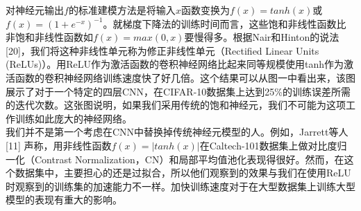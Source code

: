 对神经元输出$f$的标准建模方法是将输入$x$函数变换为$f(x) = tanh(x)$或$f(x) = (1+e^{-x})^{-1}$。就梯度下降法的训练时间而言，这些饱和非线性函数比非饱和非线性函数如$f(x)=max(0,x)$要慢得多。根据Nair和Hinton的说法[20]，我们将这种非线性单元称为修正非线性单元（Rectified Linear Units (ReLUs)）。用ReLU作为激活函数的卷积神经网络比起来同等规模使用tanh作为激活函数的卷积神经网络训练速度快了好几倍。这个结果可以从图一中看出来，该图展示了对于一个特定的四层CNN，在CIFAR-10数据集上达到25\%的训练误差所需的迭代次数。这张图说明，如果我们采用传统的饱和神经元，我们不可能为这项工作训练如此庞大的神经网络。\\

我们并不是第一个考虑在CNN中替换掉传统神经元模型的人。例如，Jarrett等人[11] 声称，用非线性函数$f(x)=|tanh(x)|$在Caltech-101数据集上做对比度归一化（Contrast Normalization，CN）和局部平均值池化表现得很好。然而，在这个数据集中，主要担心的还是过拟合，所以他们观察到的效果与我们在使用ReLU时观察到的训练集的加速能力不一样。加快训练速度对于在大型数据集上训练大型模型的表现有重大的影响。